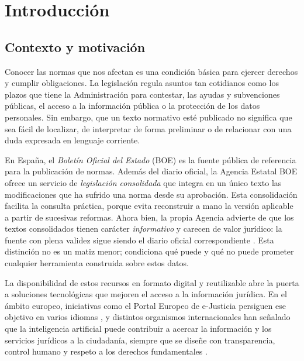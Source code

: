 \chapter{Introducción}

\label{chap:introduccion}
 
\section{Contexto y motivación}

\label{sec:contexto-motivacion}
 
Conocer las normas que nos afectan es una condición básica para ejercer derechos y cumplir obligaciones. La legislación regula asuntos tan cotidianos como los plazos que tiene la Administración para contestar, las ayudas y subvenciones públicas, el acceso a la información pública o la protección de los datos personales. Sin embargo, que un texto normativo esté publicado no significa que sea fácil de localizar, de interpretar de forma preliminar o de relacionar con una duda expresada en lenguaje corriente.
 
En España, el \emph{Boletín Oficial del Estado} (BOE) es la fuente pública de referencia para la publicación de normas. Además del diario oficial, la Agencia Estatal BOE ofrece un servicio de \emph{legislación consolidada} que integra en un único texto las modificaciones que ha sufrido una norma desde su aprobación. Esta consolidación facilita la consulta práctica, porque evita reconstruir a mano la versión aplicable a partir de sucesivas reformas. Ahora bien, la propia Agencia advierte de que los textos consolidados tienen carácter \emph{informativo} y carecen de valor jurídico: la fuente con plena validez sigue siendo el diario oficial correspondiente \cite{boeLegislacionActualizada,boeApiConsolidada}. Esta distinción no es un matiz menor; condiciona qué puede y qué no puede prometer cualquier herramienta construida sobre estos datos.
 
La disponibilidad de estos recursos en formato digital y reutilizable abre la puerta a soluciones tecnológicas que mejoren el acceso a la información jurídica. En el ámbito europeo, iniciativas como el Portal Europeo de e-Justicia persiguen ese objetivo en varios idiomas \cite{ejusticePortal}, y distintos organismos internacionales han señalado que la inteligencia artificial puede contribuir a acercar la información y los servicios jurídicos a la ciudadanía, siempre que se diseñe con transparencia, control humano y respeto a los derechos fundamentales \cite{oecdAccessJusticeAI,cepejEthicalCharter}.
 
